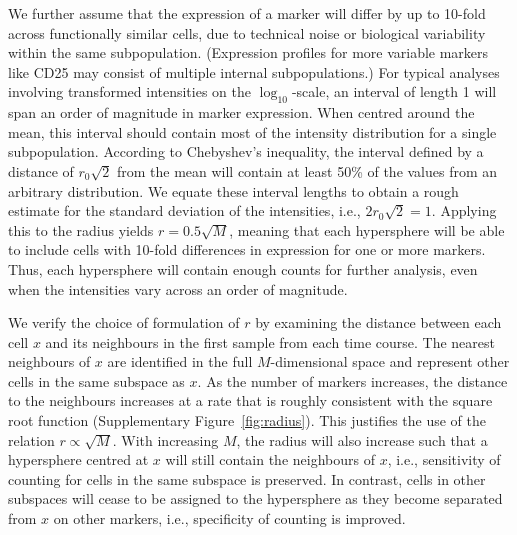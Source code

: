 \documentclass{article}
\begin{document}
We further assume that the expression of a marker will differ by up to 10-fold across functionally similar cells, due to technical noise or biological variability within the same subpopulation.
(Expression profiles for more variable markers like CD25 may consist of multiple internal subpopulations.)
For typical analyses involving transformed intensities on the $\log_{10}$-scale, an interval of length 1 will span an order of magnitude in marker expression.
When centred around the mean, this interval should contain most of the intensity distribution for a single subpopulation.
According to Chebyshev's inequality, the interval defined by a distance of $r_0\sqrt{2}$ from the mean will contain at least 50\% of the values from an arbitrary distribution.
We equate these interval lengths to obtain a rough estimate for the standard deviation of the intensities, i.e., $2r_0\sqrt{2} = 1$.
Applying this to the radius yields $r=0.5\sqrt{M}$, meaning that each hypersphere will be able to include cells with 10-fold differences in expression for one or more markers.
Thus, each hypersphere will contain enough counts for further analysis, even when the intensities vary across an order of magnitude.



We verify the choice of formulation of $r$ by examining the distance between each cell $x$ and its neighbours in the first sample from each time course.
The nearest neighbours of $x$ are identified in the full $M$-dimensional space and represent other cells in the same subspace as $x$.
As the number of markers increases, the distance to the neighbours increases at a rate that is roughly consistent with the square root function (Supplementary Figure~\ref{fig:radius}).
This justifies the use of the relation $r\propto\sqrt{M}$.
With increasing $M$, the radius will also increase such that a hypersphere centred at $x$ will still contain the neighbours of $x$, i.e., sensitivity of counting for cells in the same subspace is preserved.
In contrast, cells in other subspaces will cease to be assigned to the hypersphere as they become separated from $x$ on other markers, i.e., specificity of counting is improved.
 
\end{document}
